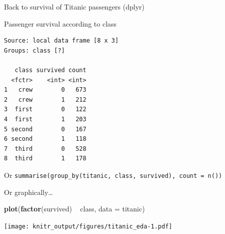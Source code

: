 \documentclass[10pt,ignorenonframetext,]{beamer}
\newenvironment{Shaded}{\begin{snugshade}}{\end{snugshade}}
\newcommand{\KeywordTok}[1]{\textcolor[rgb]{0.13,0.29,0.53}{\textbf{{#1}}}}
\newcommand{\DataTypeTok}[1]{\textcolor[rgb]{0.13,0.29,0.53}{{#1}}}
\newcommand{\StringTok}[1]{\textcolor[rgb]{0.31,0.60,0.02}{{#1}}}
\newcommand{\NormalTok}[1]{{#1}}
\begin{document}
\begin{frame}[fragile]{Back to survival of Titanic passengers (dplyr)}

Passenger survival according to class

\begin{Shaded}
\end{Shaded}

\begin{verbatim}
Source: local data frame [8 x 3]
Groups: class [?]

   class survived count
  <fctr>    <int> <int>
1   crew        0   673
2   crew        1   212
3  first        0   122
4  first        1   203
5 second        0   167
6 second        1   118
7  third        0   528
8  third        1   178
\end{verbatim}

Or
\texttt{summarise(group\_by(titanic,\ class,\ survived),\ count\ =\ n())}

\end{frame}

\begin{frame}[fragile]{Or graphically\ldots{}}

\begin{Shaded}
\begin{Highlighting}[]
\KeywordTok{plot}\NormalTok{(}\KeywordTok{factor}\NormalTok{(survived) ~}\StringTok{ }\NormalTok{class, }\DataTypeTok{data =} \NormalTok{titanic)}
\end{Highlighting}
\end{Shaded}

\texttt{[image: knitr\_output/figures/titanic\_eda-1.pdf]}

\end{frame}
\end{document}
